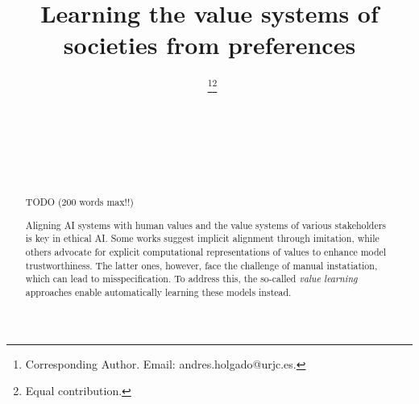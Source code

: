 \documentclass{ecai}
\begin{document}

\begin{frontmatter}




\title{Learning the value systems of societies from preferences}


\author[A]{~\thanks{Corresponding Author. Email: andres.holgado@urjc.es.}\footnote{Equal contribution.}}
\author[A]{~\footnotemark}
\author[A]{~\footnotemark} 
\author[B]{~}
\address[A]{CETINIA, Universidad Rey Juan Carlos, 28933 Madrid, Spain}
\address[B]{CSIC, Consejo Superior de Investigaciones Científicas, 28006 Madrid, Spain}

\begin{abstract}
TODO (200 words max!!)

Aligning AI systems with human values and the value systems of various stakeholders is key in ethical AI. Some works suggest implicit alignment through imitation, while others advocate for explicit computational representations of values to enhance model trustworthiness. The latter ones, however, face the challenge of manual instatiation, which can lead to misspecification. To address this, the so-called \textit{value learning} approaches enable automatically learning these models instead.


\end{abstract}
\end{frontmatter}
\end{document}
